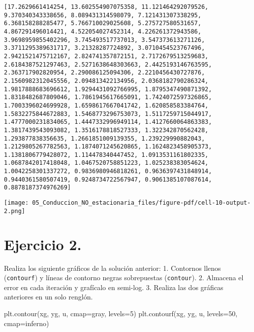 \documentclass[
  letterpaper,
  DIV=11,
  numbers=noendperiod]{scrreprt}
\newenvironment{Shaded}{\begin{snugshade}}{\end{snugshade}}
\newcommand{\DecValTok}[1]{\textcolor[rgb]{0.68,0.00,0.00}{#1}}
\newcommand{\NormalTok}[1]{\textcolor[rgb]{0.00,0.23,0.31}{#1}}
\newcommand{\OperatorTok}[1]{\textcolor[rgb]{0.37,0.37,0.37}{#1}}
\newcommand{\StringTok}[1]{\textcolor[rgb]{0.13,0.47,0.30}{#1}}
\begin{document}
\begin{verbatim}
[17.2629661414254, 13.602554907075358, 11.121464292079526, 9.370340343338656, 8.089431314598079, 7.121431307338295, 6.368158288285477, 5.766710029025608, 5.275727580531657, 4.867291496014421, 4.522054027452314, 4.226261372943586, 3.9698959855402296, 3.745493517737013, 3.547373613271126, 3.3711295389631717, 3.21328287724892, 3.0710454523767496, 2.9421521475712167, 2.824741357872151, 2.7172679513259683, 2.6184387521297463, 2.5271638648303663, 2.4425193146763595, 2.363717902820954, 2.290086125094306, 2.2210456430727876, 2.1560982312045556, 2.094813422134956, 2.0368182790286324, 1.9817888683696612, 1.9294431092766995, 1.8795347490871392, 1.8318482687809046, 1.7861945617665091, 1.7424072597326865, 1.7003396024699928, 1.6598617667041742, 1.620858583384764, 1.5832275844672883, 1.5468773296753073, 1.5117259715044917, 1.4777000231834065, 1.4447332996949114, 1.4127660064863383, 1.3817439543093082, 1.3516178818527333, 1.322342870562428, 1.293877838356635, 1.2661851009139355, 1.239229990882043, 1.2129805267782563, 1.1874071245620865, 1.1624823458905373, 1.1381806779428072, 1.114478340447452, 1.0913531161802335, 1.0687842017418048, 1.0467520758851223, 1.025238383054624, 1.0042258301337272, 0.9836980946818261, 0.9636397431848914, 0.9440361580507419, 0.9248734722567947, 0.9061385107087614, 0.8878187374976269]
\end{verbatim}

\texttt{[image: 05\_Conduccion\_NO\_estacionaria\_files/figure-pdf/cell-10-output-2.png]}

\section{Ejercicio 2.}\label{ejercicio-2.-2}

Realiza los siguiente gráficos de la solución anterior: 1. Contornos
llenos (\texttt{contourf}) y líneas de contorno negras sobrepuestas
(\texttt{contour}). 2. Almacena el error en cada iteración y grafícalo
en semi-log. 3. Realiza las dos gráficas anteriores en un solo renglón.

\begin{Shaded}
\begin{Highlighting}[]
\NormalTok{plt.contour(xg, yg, u, cmap}\OperatorTok{=}\StringTok{\textquotesingle{}gray\textquotesingle{}}\NormalTok{, levels}\OperatorTok{=}\DecValTok{5}\NormalTok{)}
\NormalTok{plt.contourf(xg, yg, u, levels}\OperatorTok{=}\DecValTok{50}\NormalTok{, cmap}\OperatorTok{=}\StringTok{\textquotesingle{}inferno\textquotesingle{}}\NormalTok{)}
\end{Highlighting}
\end{Shaded}
\end{document}
